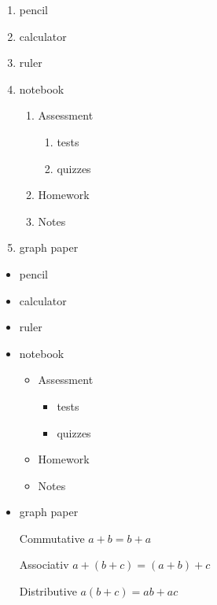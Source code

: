 \documentclass[11pt]{article}
\begin{document}
\begin{enumerate}
\item pencil
\item calculator
\item ruler
\item notebook
    \begin{enumerate}
    \item Assessment
        \begin{enumerate}
        \item tests
        \item quizzes
        \end{enumerate}
    \item Homework
    \item Notes
    \end{enumerate}
\item graph paper
\end{enumerate}


\begin{itemize}
\item pencil
\item calculator
\item ruler
\item notebook
    \begin{itemize}
    \item Assessment
        \begin{itemize}
        \item tests
        \item quizzes
        \end{itemize}
    \item Homework
    \item Notes
    \end{itemize}
\item graph paper
\end{itemize}



\begin{itemize}
\item[Commutative] $a+b=b+a$
\item[Associativ] $a+(b+c)=(a+b)+c$
\item[Distributive] $a(b+c)=ab+ac$
\end{itemize}
\end{document}
